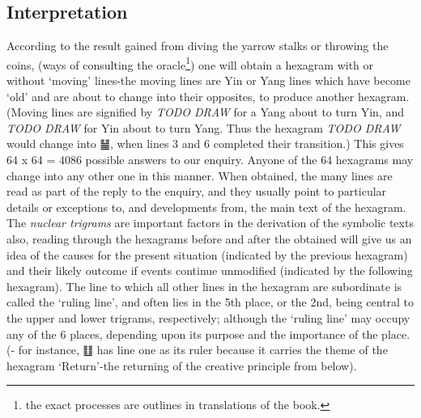 \documentclass[11pt]{book}
\begin{document}
\hypertarget{interpretation}{%
\subsection{Interpretation}\label{interpretation}}

According to the result gained from diving the yarrow stalks or throwing the coins, (ways of consulting the oracle\footnote{the exact processes are outlines in translations of the book.}) one will obtain a hexagram with or without `moving' lines-the moving lines are Yin or Yang lines which have become `old' and are about to change into their opposites, to produce another hexagram. (Moving lines are signified by \emph{TODO DRAW} for a Yang about to turn Yin, and \emph{TODO DRAW} for Yin about to turn Yang. Thus the hexagram \emph{TODO DRAW} would change into ䷡, when lines 3 and 6 completed their transition.) This gives 64 x 64 = 4086 possible answers to our enquiry. Anyone of the 64 hexagrams may change into any other one in this manner. When obtained, the many lines are read as part of the reply to the enquiry, and they usually point to particular details or exceptions to, and developments from, the main text of the hexagram. The \emph{nuclear trigrams} are important factors in the derivation of the symbolic texts also, reading through the hexagrams before and after the obtained will give us an idea of the causes for the present situation (indicated by the previous hexagram) and their likely outcome if events continue unmodified (indicated by the following hexagram). The line to which all other lines in the hexagram are subordinate is called the `ruling line', and often lies in the 5th place, or the 2nd, being central to the upper and lower trigrams, respectively; although the `ruling line' may occupy any of the 6 places, depending upon its purpose and the importance of the place. (- for instance, ䷗ has line one as its ruler because it carries the theme of the hexagram `Return'-the returning of the creative principle from below).
\end{document}
